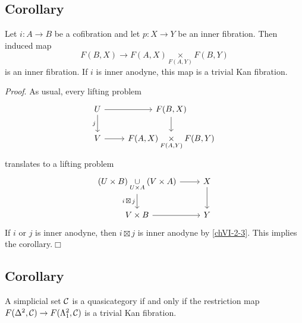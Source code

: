     \subsection{Corollary}\label{chVI-2-4}
        Let $i \colon A \to B$ be a cofibration and let $p \colon X \to Y$ be an inner fibration. Then induced map
        \begin{equation*}
            F(B, X) \to F(A, X) \underset{F(A, Y)}{\times} F(B, Y)
        \end{equation*}
        is an inner fibration. If $i$ is inner anodyne, this map is a trivial Kan fibration.
        \smallskip

        \emph{Proof}. As usual, every lifting problem
        \begin{equation*}
            \begin{tikzcd}
                U \arrow[d, "j"'] \arrow[r] & F(B, X) \arrow[d] \\
                V \arrow[r] & F(A, X) \underset{F(A, Y)}{\times} F(B, Y)
            \end{tikzcd}
        \end{equation*}
        translates to a lifting problem
        \begin{equation*}
            \begin{tikzcd}
                (U \times B) \underset{U \times A}{\cup} (V \times A) \arrow[d, "i \,\boxtimes\, j"'] \arrow[r] & X \arrow[d] \\
                V \times B \arrow[r] & Y
            \end{tikzcd}
        \end{equation*}
        If $i$ or $j$ is inner anodyne, then $i \boxtimes j$ is inner anodyne by \ref{chVI-2-3}. This implies the corollary.\hfill$\Box$

    \subsection{Corollary}\label{chVI-2-5}
        A simplicial set $\mathcal{C}$ is a quasicategory if and only if the restriction map $F(\Delta^2, \mathcal{C}) \to F(\Lambda^{2}_{1}, \mathcal{C})$ is a trivial Kan fibration.
        \smallskip

